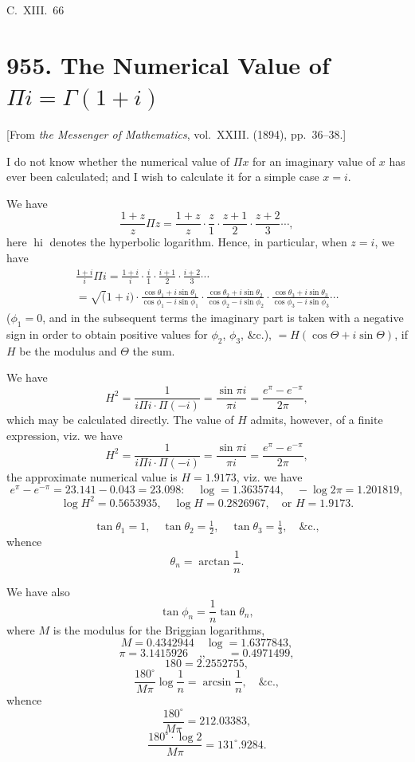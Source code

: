 \documentclass[11pt,a4paper]{book}
\begin{document}
{{{\hfill C.~XIII.~66

\newpage
\section{955. The Numerical Value of $\Pi i = \Gamma(1+i)$}
\label{sec:955}

[From \textit{the Messenger of Mathematics}, vol.~XXIII. (1894), pp.~36--38.]
\bigskip

I do not know whether the numerical value of $\Pi x$ for an imaginary value of $x$ has ever been calculated; and I wish to calculate it for a simple case $x=i$.

We have
\[
\frac{1+z}{z}\Pi z = \frac{1+z}{z}\cdot\frac{z}{1}\cdot\frac{z+1}{2}\cdot\frac{z+2}{3}\cdots,
\]
here $\operatorname{hi}$ denotes the hyperbolic logarithm. Hence, in particular, when $z=i$, we have
\begin{multline*}
\frac{1+i}{i}\Pi i =
\frac{1+i}{i}\cdot\frac{i}{1}\cdot\frac{i+1}{2}\cdot\frac{i+2}{3}\cdots \\
= \surd(1+i) \cdot \frac{\cos\theta_1+i\sin\theta_1}{\cos\phi_1-i\sin\phi_1}
\cdot \frac{\cos\theta_2+i\sin\theta_2}{\cos\phi_2-i\sin\phi_2}
\cdot \frac{\cos\theta_3+i\sin\theta_3}{\cos\phi_3-i\sin\phi_3} \cdots
\end{multline*}
($\phi_1=0$, and in the subsequent terms the imaginary part is taken with a negative sign in order to obtain positive values for $\phi_2$, $\phi_3$, \&c.), $= H(\cos\Theta + i\sin\Theta)$, if $H$ be the modulus and $\Theta$ the sum.

We have
\[
H^2 = \frac{1}{i\Pi i \cdot \Pi(-i)} = \frac{\sin\pi i}{\pi i} = \frac{e^{\pi}-e^{-\pi}}{2\pi},
\]
which may be calculated directly. The value of $H$ admits, however, of a finite expression, viz. we have
\[
H^2 = \frac{1}{i\Pi i \cdot \Pi(-i)} = \frac{\sin\pi i}{\pi i} = \frac{e^{\pi}-e^{-\pi}}{2\pi},
\]
the approximate numerical value is $H=1.9173$, viz. we have
\[
e^{\pi}-e^{-\pi} = 23.141 - 0.043 = 23.098 : \quad \log = 1.3635744, \quad -\log 2\pi = 1.201819,
\]
\[
\log H^2 = 0.5653935, \quad \log H = 0.2826967, \quad \text{or } H = 1.9173.
\]

\[
\tan\theta_1 = 1, \quad \tan\theta_2 = \tfrac{1}{2}, \quad \tan\theta_3 = \tfrac{1}{3}, \quad \&\text{c.},
\]
whence
\[
\theta_n = \arctan\frac{1}{n}.
\]

We have also
\[
\tan\phi_n = \frac{1}{n}\tan\theta_n,
\]
where $M$ is the modulus for the Briggian logarithms,
\[
M = 0.4342944 \quad \log = 1.6377843,
\]
\[
\pi = 3.1415926 \quad \text{,,}\quad\quad = 0.4971499,
\]
\[
180 = 2.2552755,
\]
\[
\frac{180^{\circ}}{M\pi}\log\frac{1}{n} = \arcsin\frac{1}{n}, \quad \&\text{c.},
\]
whence
\[
\frac{180^{\circ}}{M\pi} = 212.03383,
\]
\[
\frac{180^{\circ}\cdot\log 2}{M\pi} = 131^{\circ}.9284.
\]

}}}
\end{document}
